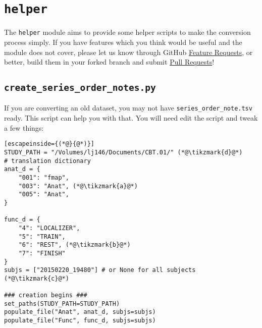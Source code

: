 \documentclass[12pt]{myland}
\def\<#1>{\texttt{#1}}
\begin{document}
\section{\<helper>}
The \<helper> module aims to provide some helper scripts to make the conversion process simply. If you have features which 
you think would be useful and the module does not cover, please let us know through GitHub
\href{https://github.com/MotivatedMemoryLab/biacpype/issues}{Feature Requests}, or better, build them in your forked
branch and submit \href{https://github.com/MotivatedMemoryLab/biacpype/pulls}{Pull Requests}!

\subsection{\<create\_series\_order\_notes.py>}
If you are converting an old dataset, you may not have \<series\_order\_note.tsv> ready. This script can help you with
that. You will need edit the script and tweak a few things:

\begin{lstlisting}[escapeinside={(*@}{@*)}]
STUDY_PATH = "/Volumes/lj146/Documents/CBT.01/" (*@\tikzmark{d}@*)
# translation dictionary
anat_d = {
    "001": "fmap", 
    "003": "Anat", (*@\tikzmark{a}@*)
    "005": "Anat",
}

func_d = {
    "4": "LOCALIZER", 
    "5": "TRAIN",
    "6": "REST", (*@\tikzmark{b}@*) 
    "7": "FINISH" 
}
subjs = ["20150220_19480"] # or None for all subjects   (*@\tikzmark{c}@*)  

### creation begins ###
set_paths(STUDY_PATH=STUDY_PATH)
populate_file("Anat", anat_d, subjs=subjs)
populate_file("Func", func_d, subjs=subjs)
\end{lstlisting}

\end{document}
